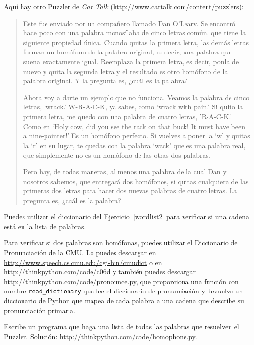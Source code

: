 \documentclass[10pt]{book}
\begin{document}
\begin{exercise}

Aquí hay otro Puzzler de {\em Car Talk}
(\url{http://www.cartalk.com/content/puzzlers}):

\begin{quote}
Este fue enviado por un compañero llamado Dan O'Leary. Se encontró hace poco con una palabra
monosílaba de cinco letras común, que tiene la siguiente propiedad
única. Cuando quitas la primera letra, las demás letras forman
un homófono de la palabra original, es decir, una palabra que suena exactamente
igual. Reemplaza la primera letra, es decir, ponla de nuevo y quita
la segunda letra y el resultado es otro homófono de la
palabra original. Y la pregunta es, ¿cuál es la palabra?

Ahora voy a darte un ejemplo que no funciona. Veamos la palabra
de cinco letras, `wrack.' W-R-A-C-K, ya sabes, como `wrack with
pain.' Si quito la primera letra, me quedo con una palabra de cuatro
letras, 'R-A-C-K.' Como en `Holy cow, did you see the rack on that buck!
It must have been a nine-pointer!' Es un homófono perfecto. Si
vuelves a poner la `w' y quitas la `r' en su lugar, te quedas con la
palabra `wack' que es una palabra real, que simplemente no es un homófono de las
otras dos palabras.

Pero hay, de todas maneras, al menos una palabra de la cual Dan y nosotros sabemos,
que entregará dos homófonos, si quitas cualquiera de las primeras dos
letras para hacer dos nuevas palabras de cuatro letras. La pregunta es, ¿cuál
es la palabra?
\end{quote}

Puedes utilizar el diccionario del Ejercicio~\ref{wordlist2} para verificar
si una cadena está en la lista de palabras.

Para verificar si dos palabras son homófonas, puedes utilizar el
Diccionario de Pronunciación de la CMU.  Lo puedes descargar en
\url{http://www.speech.cs.cmu.edu/cgi-bin/cmudict} o en
\url{http://thinkpython.com/code/c06d} y también puedes descargar
\url{http://thinkpython.com/code/pronounce.py}, que proporciona una función
con nombre \verb"read_dictionary" que lee el diccionario de pronunciación y
devuelve un diccionario de Python que mapea de cada palabra a una cadena que 
describe su pronunciación primaria.

Escribe un programa que haga una lista de todas las palabras que resuelven el Puzzler.
Solución: \url{http://thinkpython.com/code/homophone.py}.

\end{exercise}
\end{document}
